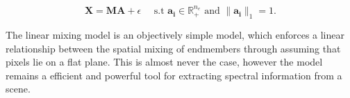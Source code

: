 \begin{equation}
    \label{lmm:abund-lmm-collection}
    \mathbf{X} = \mathbf{M} \mathbf{A} + \epsilon \quad \text{ s.t } \mathbf{a_i} \in \mathbb{R}_+^{n_e} \text{ and } \|\mathbf{a_i}\|_1 = 1.
\end{equation}

The linear mixing model is an objectively simple model, which enforces a linear relationship between the spatial mixing of endmembers through assuming that pixels lie on a flat plane. This is almost never the case, however the model remains a efficient and powerful tool for extracting spectral information from a scene. 